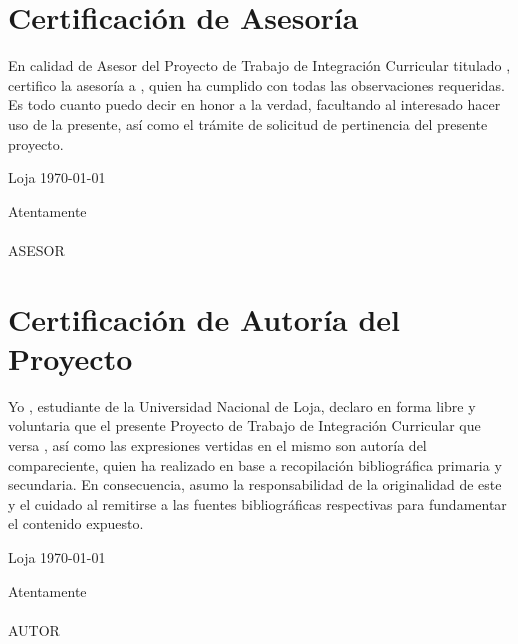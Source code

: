 \clearpage
\section*{Certificación de Asesoría}

En calidad de Asesor del Proyecto de Trabajo de Integración Curricular titulado \textbf{\tituloproyecto}, certifico la asesoría a \textbf{\nombreautor}, quien ha cumplido con todas las observaciones requeridas. Es todo cuanto puedo decir en honor a la verdad, facultando al interesado hacer uso de la presente, así como el trámite de solicitud de pertinencia del presente proyecto.

\vspace{2cm}

\begin{flushright}
Loja \today
\end{flushright}



\begin{center}
Atentamente\\[5cm]
\textbf{\nombresasesor}\\
ASESOR
\end{center}



\clearpage
\section*{Certificación de Autoría del Proyecto}

Yo \nombreautor, estudiante de la Universidad Nacional de Loja, declaro en forma libre y voluntaria que el presente Proyecto de Trabajo de Integración Curricular que versa \tituloproyecto, así como las expresiones vertidas en el mismo son autoría del compareciente, quien ha realizado en base a recopilación bibliográfica primaria y secundaria. En consecuencia, asumo la responsabilidad de la originalidad de este y el cuidado al remitirse a las fuentes bibliográficas respectivas para fundamentar el contenido expuesto.

\vspace{2cm}
\begin{flushright}
Loja \today
\end{flushright}


\begin{center}
Atentamente\\[5 cm]
\textbf{\nombreautor}\\
AUTOR
\end{center}





\clearpage
\tableofcontents
\clearpage
\listoffigures
\clearpage
\listoftables